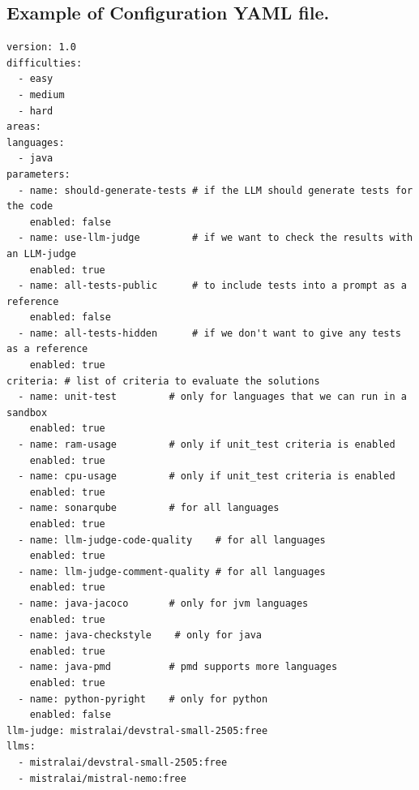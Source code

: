 \subsection*{Example of Configuration YAML file.}
\begin{verbatim}
version: 1.0
difficulties:
  - easy
  - medium
  - hard
areas:
languages:
  - java
parameters:
  - name: should-generate-tests # if the LLM should generate tests for the code
    enabled: false
  - name: use-llm-judge         # if we want to check the results with an LLM-judge
    enabled: true
  - name: all-tests-public      # to include tests into a prompt as a reference
    enabled: false
  - name: all-tests-hidden      # if we don't want to give any tests as a reference
    enabled: true
criteria: # list of criteria to evaluate the solutions
  - name: unit-test         # only for languages that we can run in a sandbox
    enabled: true
  - name: ram-usage         # only if unit_test criteria is enabled
    enabled: true
  - name: cpu-usage         # only if unit_test criteria is enabled
    enabled: true
  - name: sonarqube         # for all languages
    enabled: true
  - name: llm-judge-code-quality    # for all languages
    enabled: true
  - name: llm-judge-comment-quality # for all languages
    enabled: true
  - name: java-jacoco       # only for jvm languages
    enabled: true
  - name: java-checkstyle    # only for java
    enabled: true
  - name: java-pmd          # pmd supports more languages
    enabled: true
  - name: python-pyright    # only for python
    enabled: false
llm-judge: mistralai/devstral-small-2505:free
llms:
  - mistralai/devstral-small-2505:free
  - mistralai/mistral-nemo:free

\end{verbatim}





